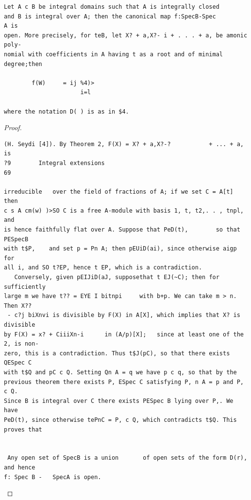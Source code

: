 \begin{theorem}\label{mcrt-auto-theorem-9-6}\uses{}
\begin{verbatim}
Let A c B be integral domains such that A is integrally closed
and B is integral over A; then the canonical map f:SpecB-Spec           A is
open. More precisely, for teB, let X? + a,X?- i + . . . + a, be amonic poly-
nomial with coefficients in A having t as a root and of minimal degree;then

        f(W)     = ij %4)>
                      i=l

where the notation D( ) is as in $4.
\end{verbatim}
\end{theorem}
\begin{proof}
\begin{verbatim}
(H. Seydi [4]). By Theorem 2, F(X) = X? + a,X?-?           + ... + a, is
?9        Integral extensions                                                      69

irreducible   over the field of fractions of A; if we set C = A[t] then
c s A cm(w) )>SO C is a free A-module with basis 1, t, t2,. . , tnpl, and
is hence faithfully flat over A. Suppose that PeD(t),        so that PESpecB
with t$P,    and set p = Pn A; then pEUiD(ai), since otherwise aigp for
all i, and SO t?EP, hence t EP, which is a contradiction.
   Conversely, given pEIJiD(aJ, supposethat t EJ(~C); then for sufficiently
large m we have t?? = EYE I bitnpi     with b+p. We can take m > n. Then X??
 - c?j biXnvi is divisible by F(X) in A[X], which implies that X? is divisible
by F(X) = x? + CiiiXn-i      in (A/p)[X];   since at least one of the 2, is non-
zero, this is a contradiction. Thus t$J(pC), so that there exists QESpec C
with t$Q and pC c Q. Setting Qn A = q we have p c q, so that by the
previous theorem there exists P, ESpec C satisfying P, n A = p and P, c Q.
Since B is integral over C there exists PESpec B lying over P,. We have
PeD(t), since otherwise tePnC = P, c Q, which contradicts t$Q. This
proves that


 Any open set of SpecB is a union       of open sets of the form D(r), and hence
f: Spec B -   SpecA is open.
\end{verbatim}
\end{proof}


